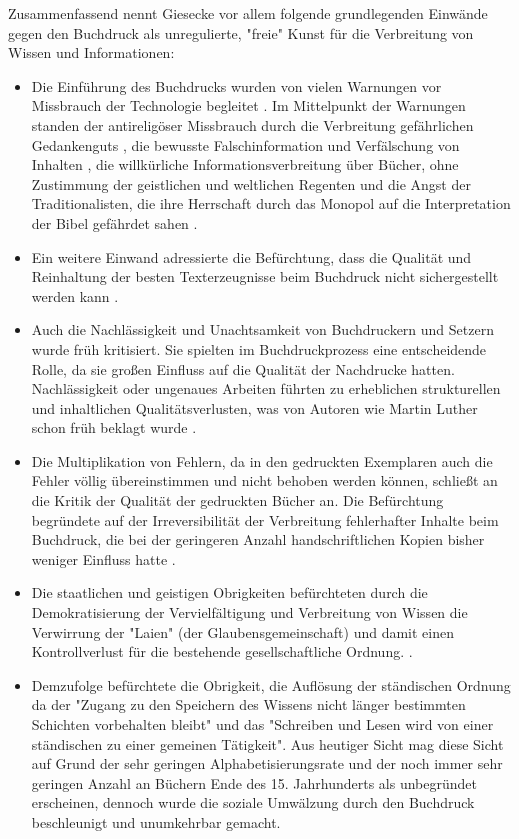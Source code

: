 Zusammenfassend nennt Giesecke vor allem folgende grundlegenden Einwände gegen den Buchdruck als unregulierte, "freie" Kunst \cite{giesecke_1991_buchdruck} für die Verbreitung von Wissen und Informationen:
\begin{itemize}
\item Die Einführung des Buchdrucks wurden von vielen Warnungen vor Missbrauch der Technologie begleitet \cite{lange2008medienwettbewerb}. Im Mittelpunkt der Warnungen standen der antireligöser Missbrauch durch die Verbreitung gefährlichen Gedankenguts \cite{kruse2003multimedia}, die bewusste Falschinformation und Verfälschung von Inhalten \cite{sprachgeschichte_1998_besch}, die willkürliche Informationsverbreitung über Bücher, ohne Zustimmung der geistlichen und weltlichen Regenten \cite{rother_2002_siebenbuergen} und die Angst der Traditionalisten, die ihre Herrschaft durch das Monopol auf die Interpretation der Bibel gefährdet sahen \cite{lange2008medienwettbewerb}.
\item Ein weitere Einwand adressierte die Befürchtung, dass die Qualität und Reinhaltung der besten Texterzeugnisse beim Buchdruck nicht sichergestellt werden kann \cite{giesecke_1991_buchdruck}.
\item Auch die Nachlässigkeit und Unachtsamkeit von Buchdruckern und Setzern wurde früh kritisiert. Sie spielten im Buchdruckprozess eine entscheidende Rolle, da sie großen Einfluss auf die Qualität der Nachdrucke hatten. Nachlässigkeit oder ungenaues Arbeiten führten zu erheblichen strukturellen und inhaltlichen Qualitätsverlusten, was von Autoren wie Martin Luther schon früh beklagt wurde \cite{sprachgeschichte_1998_besch} \cite{stober_2014_pressegeschichte} \cite{luther_1876}.
\item Die Multiplikation von Fehlern, da in den gedruckten Exemplaren auch die Fehler völlig übereinstimmen und nicht behoben werden können, schließt an die Kritik der Qualität der gedruckten Bücher an. Die Befürchtung begründete auf der Irreversibilität der Verbreitung fehlerhafter Inhalte beim Buchdruck, die bei der geringeren Anzahl handschriftlichen Kopien bisher weniger Einfluss hatte \cite{kittler_2004}.
\item Die staatlichen und geistigen Obrigkeiten befürchteten durch die Demokratisierung der Vervielfältigung und Verbreitung von Wissen die Verwirrung der "Laien" (der Glaubensgemeinschaft) und damit einen Kontrollverlust für die bestehende gesellschaftliche Ordnung. \cite{giesecke_1991_buchdruck}.
\item Demzufolge befürchtete die Obrigkeit, die Auflösung der ständischen Ordnung da der "Zugang zu den Speichern des Wissens nicht länger bestimmten Schichten vorbehalten bleibt" und das "Schreiben und Lesen wird von einer ständischen zu einer gemeinen Tätigkeit". Aus heutiger Sicht mag diese Sicht auf Grund der sehr geringen Alphabetisierungsrate und der noch immer sehr geringen Anzahl an Büchern Ende des 15. Jahrhunderts als unbegründet erscheinen, dennoch wurde die soziale Umwälzung durch den Buchdruck beschleunigt und unumkehrbar gemacht. \cite{giesecke_1991_buchdruck}

\end{itemize}
